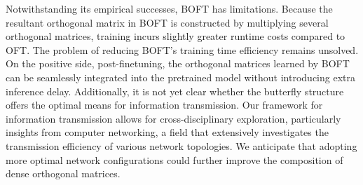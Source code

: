 Notwithstanding its empirical successes, BOFT has limitations. Because the resultant orthogonal matrix in BOFT is constructed by multiplying several orthogonal matrices, training incurs slightly greater runtime costs compared to OFT. The problem of reducing BOFT's training time efficiency remains unsolved. On the positive side, post-finetuning, the orthogonal matrices learned by BOFT can be seamlessly integrated into the pretrained model without introducing extra inference delay. Additionally, it is not yet clear whether the butterfly structure offers the optimal means for information transmission. Our framework for information transmission allows for cross-disciplinary exploration, particularly insights from computer networking, a field that extensively investigates the transmission efficiency of various network topologies. We anticipate that adopting more optimal network configurations could further improve the composition of dense orthogonal matrices.